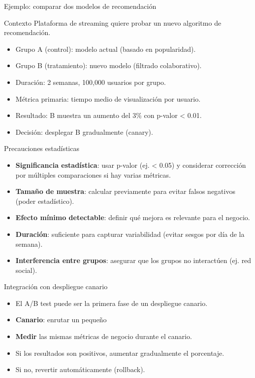 \documentclass[aspectratio=169, 10pt, xcolor=table]{beamer}
\begin{document}
\begin{frame}{Ejemplo: comparar dos modelos de recomendación}
    \begin{block}{Contexto}
        Plataforma de streaming quiere probar un nuevo algoritmo de recomendación.
    \end{block}
    \begin{itemize}
        \item Grupo A (control): modelo actual (basado en popularidad).
        \item Grupo B (tratamiento): nuevo modelo (filtrado colaborativo).
        \item Duración: 2 semanas, 100,000 usuarios por grupo.
        \item Métrica primaria: tiempo medio de visualización por usuario.
        \item Resultado: B muestra un aumento del 3\% con p-valor < 0.01.
        \item Decisión: desplegar B gradualmente (canary).
    \end{itemize}
\end{frame}

\begin{frame}{Precauciones estadísticas}
    \begin{itemize}
        \item \textbf{Significancia estadística}: usar p-valor (ej. < 0.05) y considerar corrección por múltiples comparaciones si hay varias métricas.
        \item \textbf{Tamaño de muestra}: calcular previamente para evitar falsos negativos (poder estadístico).
        \item \textbf{Efecto mínimo detectable}: definir qué mejora es relevante para el negocio.
        \item \textbf{Duración}: suficiente para capturar variabilidad (evitar sesgos por día de la semana).
        \item \textbf{Interferencia entre grupos}: asegurar que los grupos no interactúen (ej. red social).
    \end{itemize}
\end{frame}

\begin{frame}{Integración con despliegue canario}
    \begin{itemize}
        \item El A/B test puede ser la primera fase de un despliegue canario.
        \item \textbf{Canario}: enrutar un pequeño %
        \item \textbf{Medir} las mismas métricas de negocio durante el canario.
        \item Si los resultados son positivos, aumentar gradualmente el porcentaje.
        \item Si no, revertir automáticamente (rollback).
    \end{itemize}
\end{frame}
\end{document}
